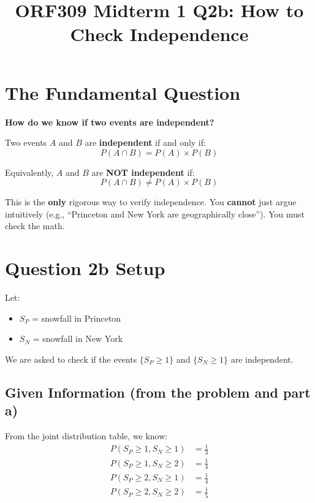\documentclass[11pt]{article}
\title{ORF309 Midterm 1 Q2b: How to Check Independence}
\author{}
\date{}
\begin{document}
\maketitle

\section*{The Fundamental Question}

\textbf{How do we know if two events are independent?}

\begin{tcolorbox}[colback=blue!10, colframe=blue!50!black, title=Definition of Independence]
Two events $A$ and $B$ are \textbf{independent} if and only if:
\[
P(A \cap B) = P(A) \times P(B)
\]

Equivalently, $A$ and $B$ are \textbf{NOT independent} if:
\[
P(A \cap B) \neq P(A) \times P(B)
\]
\end{tcolorbox}

This is the \textbf{only} rigorous way to verify independence. You \textbf{cannot} just argue intuitively (e.g., ``Princeton and New York are geographically close''). You must check the math.

\section*{Question 2b Setup}

Let:
\begin{itemize}
    \item $S_P$ = snowfall in Princeton
    \item $S_N$ = snowfall in New York
\end{itemize}

We are asked to check if the events $\{S_P \geq 1\}$ and $\{S_N \geq 1\}$ are independent.

\subsection*{Given Information (from the problem and part a)}

From the joint distribution table, we know:
\begin{align*}
P(S_P \geq 1, S_N \geq 1) &= \frac{1}{3} \\
P(S_P \geq 1, S_N \geq 2) &= \frac{1}{4} \\
P(S_P \geq 2, S_N \geq 1) &= \frac{1}{4} \\
P(S_P \geq 2, S_N \geq 2) &= \frac{1}{5}
\end{align*}
\end{document}
